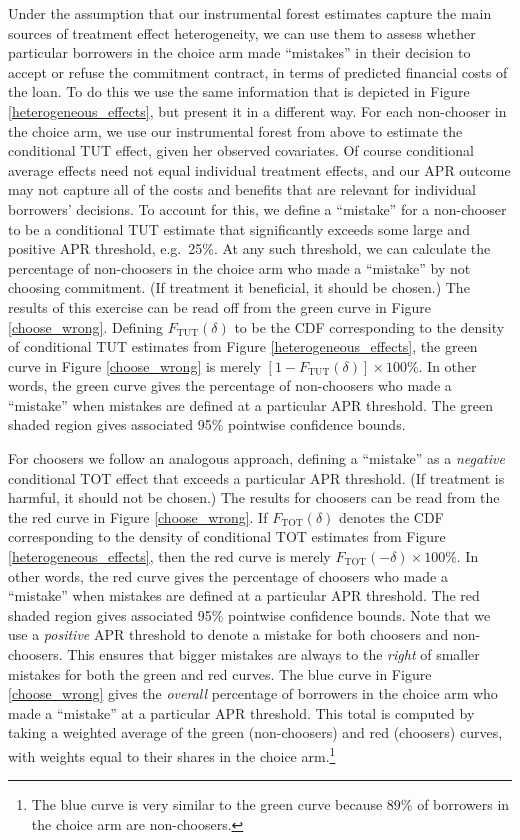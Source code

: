 \documentclass[oneside,11pt]{article}
\begin{document}
Under the assumption that our instrumental forest estimates capture the main sources of treatment effect heterogeneity, we can use them to assess whether particular borrowers in the choice arm made ``mistakes'' in their decision to accept or refuse the commitment contract, in terms of predicted financial costs of the loan.
To do this we use the same information that is depicted in Figure \ref{heterogeneous_effects}, but present it in a different way.
For each non-chooser in the choice arm, we use our instrumental forest from above to estimate the conditional TUT effect, given her observed covariates.
Of course conditional average effects need not equal individual treatment effects, and our APR outcome may not capture all of the costs and benefits that are relevant for individual borrowers' decisions.
To account for this, we define a ``mistake'' for a non-chooser to be a conditional TUT estimate that significantly exceeds some large and positive APR threshold, e.g.\ 25\%. 
At any such threshold, we can calculate the percentage of non-choosers in the choice arm who made a ``mistake'' by not choosing commitment.   
(If treatment it beneficial, it should be chosen.)
The results of this exercise can be read off from the green curve in Figure \ref{choose_wrong}.
Defining $F_{\text{TUT}}(\delta)$ to be the CDF corresponding to the density of conditional TUT estimates from Figure \ref{heterogeneous_effects}, the green curve in Figure \ref{choose_wrong} is merely $[1 - F_{\text{TUT}}(\delta)] \times 100\%$.
In other words, the green curve gives the percentage of non-choosers who made a ``mistake'' when mistakes are defined at a particular APR threshold.
The green shaded region gives associated 95\% pointwise confidence bounds.

For choosers we follow an analogous approach, defining a ``mistake'' as a \emph{negative} conditional TOT effect that exceeds a particular APR threshold.
(If treatment is harmful, it should not be chosen.)
The results for choosers can be read from the the red curve in Figure \ref{choose_wrong}.
If $F_{\text{TOT}}(\delta)$ denotes the CDF corresponding to the density of conditional TOT estimates from Figure \ref{heterogeneous_effects}, then the red curve is merely $F_{\text{TOT}}(-\delta) \times 100\%$.
In other words, the red curve gives the percentage of choosers who made a ``mistake'' when mistakes are defined at a particular APR threshold.
The red shaded region gives associated 95\% pointwise confidence bounds.
Note that we use a \emph{positive} APR threshold to denote a mistake for both choosers and non-choosers. 
This ensures that bigger mistakes are always to the \emph{right} of smaller mistakes for both the green and red curves.
The blue curve in Figure \ref{choose_wrong} gives the \emph{overall} percentage of borrowers in the choice arm who made a ``mistake'' at a particular APR threshold.
This total is computed by taking a weighted average of the green (non-choosers) and red (choosers) curves, with weights equal to their shares in the choice arm.\footnote{The blue curve is very similar to the green curve because 89\% of borrowers in the choice arm are non-choosers.}
\end{document}
